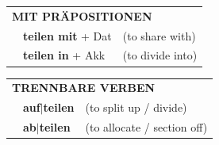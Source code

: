 \documentclass[10pt,a4paper]{revtex4-2}
\begin{document}
\begin{verbbox}
\vspace{10pt}

\begin{tabular}{lll}
\multicolumn{3}{l}{\textbf{MIT PRÄPOSITIONEN}}\\
& \textbf{teilen mit} + Dat & (to share with)\\
& \textbf{teilen in} + Akk & (to divide into)\\
\end{tabular}
\hfill
\begin{tabular}{lll}
\multicolumn{3}{l}{\textbf{TRENNBARE VERBEN}}\\
& \textbf{auf$|$teilen} & (to split up / divide)\\
& \textbf{ab$|$teilen} & (to allocate / section off)\\
\end{tabular}
\vspace{-5pt}
\end{verbbox}
\end{document}
